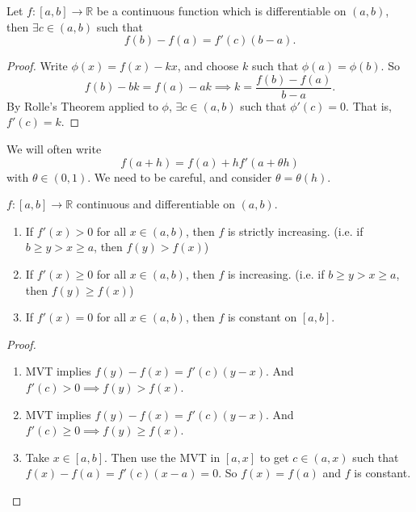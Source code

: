 \leavevmode
\begin{theorem}
    \label{MVT}
    Let \(f: [a,b] \to \mathbb{R}\) be a continuous function which is differentiable on \((a,b)\), then \(\exists c \in (a,b)\) such that
    \[
        f(b) - f(a) = f'(c)(b-a).
    \]
\end{theorem}
\begin{proof}
    Write \(\phi(x) = f(x) - kx\), and choose \(k\) such that \(\phi(a) = \phi(b)\). So
    \[
        f(b) - bk = f(a) - ak \implies k = \frac{f(b) - f(a)}{b-a}.
    \]
    By Rolle's Theorem applied to \(\phi\), \(\exists c \in (a,b)\) such that \(\phi'(c) = 0\). That is, \(f'(c) = k\).
\end{proof}
\begin{remark}
    We will often write
    \[
        f(a + h) = f(a) + hf'(a + \theta h)
    \]
    with \(\theta \in (0,1)\). We need to be careful, and consider \(\theta = \theta(h)\).
\end{remark}
\begin{corollary}
    \label{incder}
    \(f: [a,b] \to \mathbb{R}\) continuous and differentiable on \((a,b)\).
    \begin{enumerate}
        \item If \(f'(x) > 0\) for all \(x \in (a,b)\), then \(f\) is strictly increasing. (i.e. if \(b \geq y > x \geq a\), then \(f(y) > f(x)\))
        \item If \(f'(x) \geq 0\) for all \(x \in (a,b)\), then \(f\) is increasing. (i.e. if \(b \geq y > x \geq a\), then \(f(y) \geq f(x)\))
        \item If \(f'(x) = 0\) for all \(x \in (a,b)\), then \(f\) is constant on \([a,b]\).
    \end{enumerate}
\end{corollary}
\begin{proof}
    \leavevmode
    \begin{enumerate}
        \item MVT implies \(f(y) - f(x) = f'(c)(y-x)\). And \(f'(c) > 0 \implies f(y) > f(x)\).
        \item MVT implies \(f(y) - f(x) = f'(c)(y-x)\). And \(f'(c) \geq  0 \implies f(y) \geq f(x)\).
        \item Take \(x \in [a,b]\). Then use the MVT in \([a,x]\) to get \(c \in (a,x)\) such that \(f(x) - f(a) = f'(c) (x-a) = 0\). So \(f(x) = f(a)\) and \(f\) is constant.
    \end{enumerate}
\end{proof}
